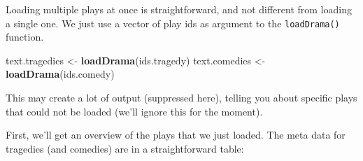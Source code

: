 \documentclass[]{book}
\newenvironment{Shaded}{\begin{snugshade}}{\end{snugshade}}
\newcommand{\KeywordTok}[1]{\textcolor[rgb]{0.13,0.29,0.53}{\textbf{#1}}}
\newcommand{\NormalTok}[1]{#1}
\newcommand{\OperatorTok}[1]{\textcolor[rgb]{0.81,0.36,0.00}{\textbf{#1}}}
\newcommand{\StringTok}[1]{\textcolor[rgb]{0.31,0.60,0.02}{#1}}
\begin{document}
Loading multiple plays at once is straightforward, and not different from loading a single one. We just use a vector of play ids as argument to the \texttt{loadDrama()} function.

\begin{Shaded}
\begin{Highlighting}[]
\NormalTok{text.tragedies <-}\StringTok{ }\KeywordTok{loadDrama}\NormalTok{(ids.tragedy)}
\NormalTok{text.comedies  <-}\StringTok{ }\KeywordTok{loadDrama}\NormalTok{(ids.comedy)}
\end{Highlighting}
\end{Shaded}

This may create a lot of output (suppressed here), telling you about specific plays that could not be loaded (we'll ignore this for the moment).

First, we'll get an overview of the plays that we just loaded. The meta data for tragedies (and comedies) are in a straightforward table:

\begin{Shaded}
\end{Shaded}
\end{document}
